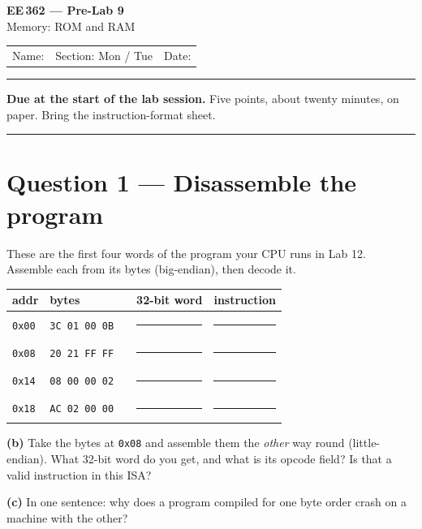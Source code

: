 \documentclass[11pt]{article}
\newcommand{\code}[1]{\texttt{#1}}
\newcommand{\answerbox}[1]{\vspace{2pt}\fbox{\parbox[c][#1][c]{\dimexpr\linewidth-2\fboxsep-2\fboxrule}{\ }}\vspace{4pt}}
\begin{document}
\begin{center}
{\Large\bfseries EE\,362 --- Pre-Lab 9}\\[2pt]
{\large Memory: ROM and RAM}\\[6pt]
\begin{tabular}{@{}p{6.5cm}p{4cm}p{4cm}@{}}
Name: \hrulefill & Section: Mon / Tue & Date: \hrulefill
\end{tabular}
\end{center}

\vspace{2pt}\hrule\vspace{4pt}

{\small\textbf{Due at the start of the lab session.} Five points, about twenty
minutes, on paper. Bring the instruction-format sheet.}

\vspace{4pt}\hrule

\section*{Question 1 --- Disassemble the program}

These are the first four words of the program your CPU runs in Lab 12. Assemble
each from its bytes (big-endian), then decode it.

\begin{center}
\begin{tabular}{lll@{\hskip 6pt}||@{\hskip 6pt}l@{\hskip 10pt}l}
\toprule
addr & bytes & & 32-bit word & instruction \\
\midrule
\code{0x00} & \code{3C 01 00 0B} & & \rule{2.8cm}{0.4pt} & \rule{4cm}{0.4pt} \\[5pt]
\code{0x08} & \code{20 21 FF FF} & & \rule{2.8cm}{0.4pt} & \rule{4cm}{0.4pt} \\[5pt]
\code{0x14} & \code{08 00 00 02} & & \rule{2.8cm}{0.4pt} & \rule{4cm}{0.4pt} \\[5pt]
\code{0x18} & \code{AC 02 00 00} & & \rule{2.8cm}{0.4pt} & \rule{4cm}{0.4pt} \\
\bottomrule
\end{tabular}
\end{center}

\textbf{(b)} Take the bytes at \code{0x08} and assemble them the \emph{other}
way round (little-endian). What 32-bit word do you get, and what is its opcode
field? Is that a valid instruction in this ISA?

\answerbox{2.0cm}

\textbf{(c)} In one sentence: why does a program compiled for one byte order
crash on a machine with the other?
\end{document}
